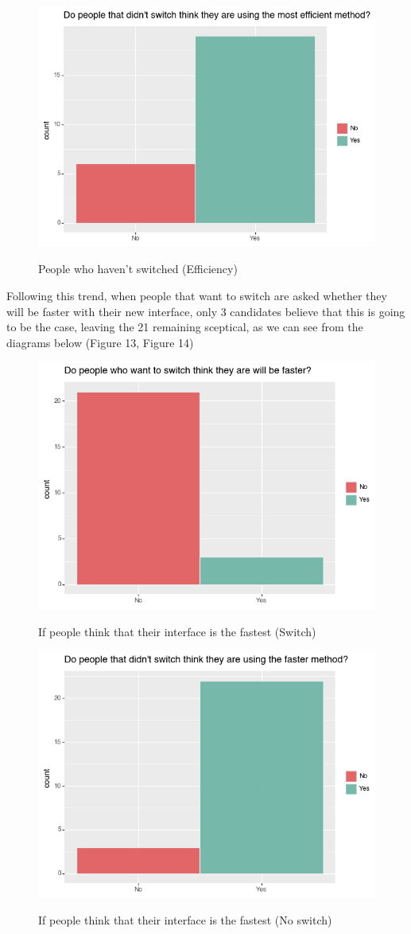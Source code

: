 \documentclass[]{report}
\begin{document}
		\begin{figure}[H]
			\centering
			\includegraphics[width=0.75\linewidth]{EfficientNoSwitch}\\
			\caption{People who haven't switched (Efficiency)}
			\label{fig: 10}
		\end{figure}
		Following this trend, when people that want to switch are asked whether they will be faster with their new interface,  only 3 candidates believe that this is going to be the case, leaving the 21 remaining sceptical, as we can see from the diagrams below (Figure 13, Figure 14)
		\begin{figure}[H]
			\centering
			\includegraphics[width=0.75\linewidth]{SpeedSwitch}\\
			\caption{If people think that their interface is the fastest (Switch)}
			\label{fig:11}
		\end{figure}
		\begin{figure}[H]
			\centering
			\includegraphics[width=0.75\linewidth]{SpeedNoSwitch}\\
			\caption{If people think that their interface is the fastest (No switch)}
			\label{fig: 12}
		\end{figure}
		
\end{document}
